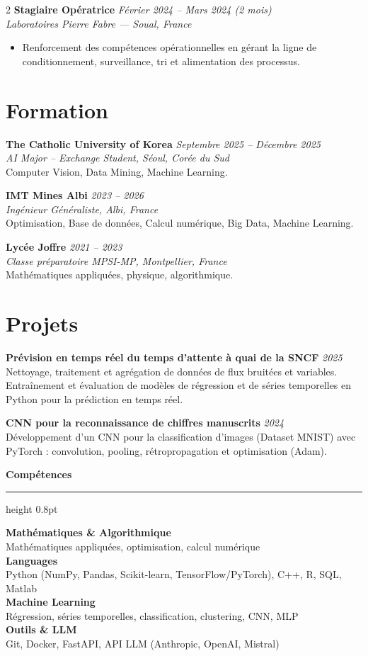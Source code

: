 \documentclass[10.5pt,a4paper]{article}
\newcommand{\sectionrule}{\vspace{-6pt}{\color{accent}\hrule height 1pt}\vspace{2pt}}
\newcommand{\subsectitle}[1]{%
  {\color{accent}\bfseries\large #1}\\[-2pt]
  {\color{accent}\hrule height 0.8pt}\vspace{4pt}
}
\newcommand{\cvexp}[5]{%
  \noindent\textbf{#1} \hfill {\itshape\color{graytext}\small #4}\\
  {\itshape #2 --- #3}\\[-2pt]
  #5
  \vspace{3pt}
}
\newcommand{\cvedu}[5]{%
  \noindent\textbf{#1} \hfill {\itshape\color{graytext}\small #4}\\
  {\itshape #2, #3}\\[1pt]
  {\small #5}
  \vspace{2pt}
}
\newcommand{\cvproject}[3]{%
  \noindent\textbf{#1} \hfill {\itshape\color{graytext}\small #2}\\[1pt]
  {\small #3}
  \vspace{2pt}
}
\newcommand{\sidebarline}[2]{%
  \noindent\textbf{\small #1}\\
  {\small #2}\\[3pt]
}
\begin{document}
\begin{paracol}{2}
\cvexp{Stagiaire Opératrice}{Laboratoires Pierre Fabre}{Soual, France}{Février 2024 -- Mars 2024 (2 mois)}{%
  \begin{itemize}[leftmargin=12pt, itemsep=2pt, topsep=0pt, partopsep=0pt, parsep=0pt]
    \item Renforcement des compétences opérationnelles en gérant la ligne de conditionnement, surveillance, tri et alimentation des processus.
  \end{itemize}
}

\section*{Formation}
\sectionrule

\cvedu{The Catholic University of Korea}{AI Major -- Exchange Student}{Séoul, Corée du Sud}{Septembre 2025 -- Décembre 2025}{Computer Vision, Data Mining, Machine Learning.}

\cvedu{IMT Mines Albi}{Ingénieur Généraliste}{Albi, France}{2023 -- 2026}{Optimisation, Base de données, Calcul numérique, Big Data, Machine Learning.}

\cvedu{Lycée Joffre}{Classe préparatoire MPSI-MP}{Montpellier, France}{2021 -- 2023}{Mathématiques appliquées, physique, algorithmique.}

\section*{Projets}
\sectionrule

\cvproject{Prévision en temps réel du temps d'attente à quai de la SNCF}{2025}{Nettoyage, traitement et agrégation de données de flux bruitées et variables. Entraînement et évaluation de modèles de régression et de séries temporelles en Python pour la prédiction en temps réel.}

\cvproject{CNN pour la reconnaissance de chiffres manuscrits}{2024}{Développement d'un CNN pour la classification d'images (Dataset MNIST) avec PyTorch : convolution, pooling, rétropropagation et optimisation (Adam).}

\switchcolumn

\vspace{2pt}

\subsectitle{Compétences}

\sidebarline{Mathématiques \& Algorithmique}{Mathématiques appliquées, optimisation, calcul numérique}
\sidebarline{Languages}{Python (NumPy, Pandas, Scikit-learn, TensorFlow/\allowbreak PyTorch), C++, R, SQL, Matlab}
\sidebarline{Machine Learning}{Régression, séries temporelles, classification, clustering, CNN, MLP}
\sidebarline{Outils \& LLM}{Git, Docker, FastAPI, API LLM (Anthropic, OpenAI, Mistral)}


\end{paracol}
\end{document}
